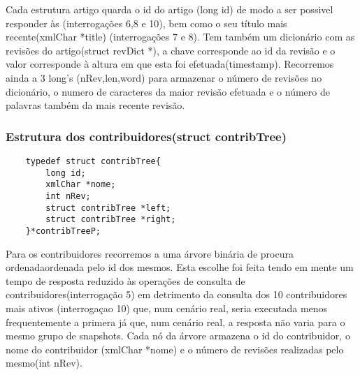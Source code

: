 \documentclass{report}
\begin{document}
Cada estrutura artigo quarda o id do artigo (long id) de modo a ser possivel responder às (interrogações 6,8 e 10), bem como o seu título mais recente(xmlChar *title) (interrogações 7 e 8). Tem também um dicionário com as revisões do artigo(struct revDict *), a chave corresponde ao id da revisão e o valor corresponde à altura em que esta foi efetuada(timestamp). Recorremos ainda a 3 long's (nRev,len,word) para armazenar o número de revisões no dicionário, o numero de caracteres da maior revisão efetuada e o número de palavras também da mais recente revisão.	

\subsubsection{Estrutura dos contribuidores(struct contribTree)}
\begin{verbatim}
    typedef struct contribTree{
        long id;
        xmlChar *nome;
        int nRev;
        struct contribTree *left;
        struct contribTree *right;
    }*contribTreeP;
\end{verbatim}


Para os contribuidores recorremos a uma árvore binária de procura ordenadaordenada pelo id dos mesmos. Esta escolhe foi feita tendo em mente um tempo de resposta reduzido às operações de consulta de contribuidores(interrogação 5) em detrimento da consulta dos 10 contribuidores mais ativos (interrogaçao 10) que, num cenário real, seria executada menos frequentemente a primera já que, num cenário real, a resposta não varia para o mesmo grupo de snapshots. Cada nó da árvore armazena o id do contribuidor, o nome do contribuidor (xmlChar *nome) e o número de revisões realizadas pelo mesmo(int nRev).
\end{document}
